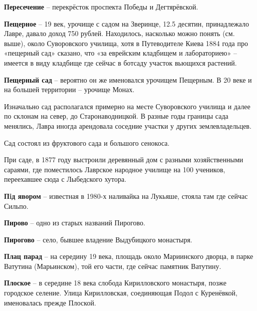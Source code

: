 \textbf{Пересечение} – перекрёсток проспекта Победы и Дегтярёвской.\\

\medskip



\textbf{Пещерное} – 19 век, урочище с садом на Зверинце, 12.5 десятин, принадлежало Лавре, давало доход 750 рублей. Находилось, насколько можно понять (см. выше), около Суворовского училища, хотя в Путеводителе Киева 1884 года про «пещерный сад» сказано, что «за еврейским кладбищем и лабораториею» – имеется в виду кладбище где сейчас в ботсаду участок вьющихся растений.\\

\medskip

\textbf{Пещерный сад} – вероятно он же именовался урочищем Пещерным. В 20 веке и на большей территории – урочище Монах.

Изначально сад располагался примерно на месте Суворовского училища и далее по склонам на север, до Старонаводницкой. В разные годы границы сада менялись, Лавра иногда арендовала соседние участки у других землевладельцев.

Сад состоял из фруктового сада и большого сенокоса. 

При саде, в 1877 году выстроили деревянный дом с разными хозяйственными сараями, где поместилось Лаврское народное училище на 100 учеников, переехавшее сюда с Лыбедского хутора.\\

\medskip

\textbf{Пiд явором} – известная в 1980-х наливайка на Лукьяше, стояла там где сейчас Сильпо.\\

\medskip

\textbf{Пирово} – одно из старых названий Пирогово.\\

\medskip

\textbf{Пирогово} – село, бывшее владение Выдубицкого монастыря.\\


\medskip

\textbf{Плац парад} – на середину 19 века, площадь около Мариинского дворца, в парке Ватутина (Марьинском), той его части, где сейчас памятник Ватутину.\\


\medskip


\textbf{Плоское} – в середине 18 века слобода Кирилловского монастыря, позже городское селение. Улица Кирилловская, соединяющая Подол с Куренёвкой, именовалась прежде Плоской.

